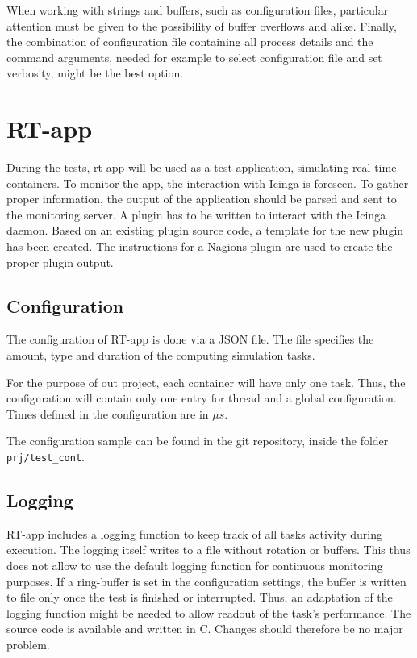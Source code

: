\documentclass[]{scrartcl}
\begin{document}
When working with strings and buffers, such as configuration files, particular attention must be given to the possibility of buffer overflows and alike.
Finally, the combination of configuration file containing all process details and the command arguments, needed for example to select configuration file and set verbosity, might be the best option.

\section{RT-app}

During the tests, rt-app will be used as a test application, simulating real-time containers. 
To monitor the app, the interaction with Icinga is foreseen.
To gather proper information, the output of the application should be parsed and sent to the monitoring server.
A plugin has to be written to interact with the Icinga daemon.
Based on an existing plugin source code, a template for the new plugin has been created. 
The instructions for a \href{{https://nagios-plugins.org/doc/guidelines.html#DEVREQUIREMENTS}}{Nagions plugin} are used to create the proper plugin output.


\subsection{Configuration}

The configuration of RT-app is done via a JSON file. The file specifies the amount, type and duration of the computing simulation tasks.

For the purpose of out project, each container will have only one task. 
Thus, the configuration will contain only one entry for thread and a global configuration.
Times defined in the configuration are in $\mu s$.

The configuration sample can be found in the git repository, inside the folder \texttt{prj/test\_cont}.

\subsection{Logging}

RT-app includes a logging function to keep track of all tasks activity during execution. The logging itself writes to a file without rotation or buffers.
This thus does not allow to use the default logging function for continuous monitoring purposes.
If a ring-buffer is set in the configuration settings, the buffer is written to file only once the test is finished or interrupted. 
Thus, an adaptation of the logging function might be needed to allow readout of the task's performance.
The source code is available and written in C. Changes should therefore be no major problem.
\end{document}
